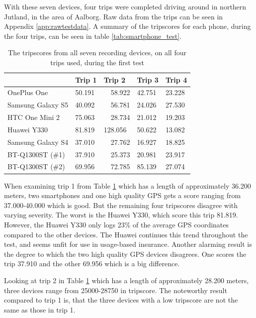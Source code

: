 With these seven devices, four trips were completed driving around in northern Jutland, in the area of Aalborg. Raw data from the trips can be seen in Appendix \ref{app:rawtestdata}. A summary of the tripscores for each phone, during the four trips, can be seen in table \ref{tab:smartphone_test}.

\begin{table}[tb]
\centering
\caption{The tripscores from all seven recording devices, on all four trips used, during the first test}
\label{tab:smartphone_test_one}
\begin{tabular}{|l|llll|}
\hline
\rowcolor{tablegreen}

                   & \textbf{Trip 1}    & \textbf{Trip 2}    & \textbf{Trip 3}    & \textbf{Trip 4}  \\\hline
OnePlus One        & 50.191   & \ \  58.922   & 42.751   & 23.228 \\
Samsung Galaxy S5  & 40.092   & \ \ 56.781   & 24.026   & 27.530 \\
HTC One Mini 2     & 75.063   & \ \ 28.734   & 21.012   & 19.203 \\
Huawei Y330        & 81.819   &  128.056   & 50.622   & 13.082 \\
Samsung Galaxy S4  & 37.010   & \ \ 27.762   & 16.927   & 18.825 \\
BT-Q1300ST (\#1)   & 37.910   & \ \ 25.373   & 20.981   & 23.917 \\
BT-Q1300ST (\#2)   & 69.956   & \ \ 72.785   & 85.139   & 27.074 \\\hline

\end{tabular}
\end{table}

When examining trip 1 from Table \ref{tab:smartphone_test_one} which has a length of approximately 36.200 meters, two smartphones and one high quality GPS gets a score ranging from 37.000-40.000 which is good. But the remaining four tripscores disagree with varying severity. The worst is the Huawei Y330, which score this trip 81.819. However, the Huawei Y330 only logs 23\% of the average GPS coordinates compared to the other devices. The Huawei continues this trend throughout the test, and seems unfit for use in usage-based insurance. Another alarming result is the degree to which the two high quality GPS devices disagrees. One scores the trip 37.910 and the other 69.956 which is a big difference.

Looking at trip 2 in Table \ref{tab:smartphone_test_one} which has a length of approximately 28.200 meters, three devices range from 25000-28750 in tripscore. The noteworthy result compared to trip 1 is, that the three devices with a low tripscore are not the same as those in trip 1.

